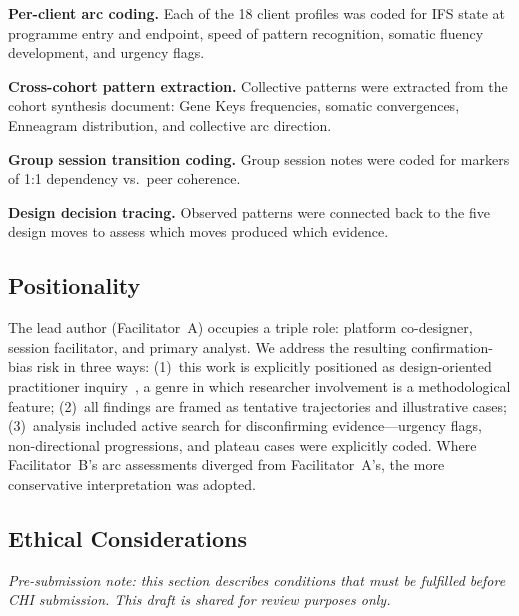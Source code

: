 \documentclass[sigchi,review,anonymous]{acmart}
\begin{document}
\textbf{Per-client arc coding.} Each of the 18 client profiles was coded for IFS state at
programme entry and endpoint, speed of pattern recognition, somatic fluency development, and
urgency flags.

\textbf{Cross-cohort pattern extraction.} Collective patterns were extracted from the cohort
synthesis document: Gene Keys frequencies, somatic convergences, Enneagram distribution, and
collective arc direction.

\textbf{Group session transition coding.} Group session notes were coded for markers of 1:1
dependency vs.\ peer coherence.

\textbf{Design decision tracing.} Observed patterns were connected back to the five design
moves to assess which moves produced which evidence.

\subsection{Positionality}

The lead author (Facilitator~A) occupies a triple role: platform co-designer, session
facilitator, and primary analyst. We address the resulting confirmation-bias risk in three
ways: (1)~this work is explicitly positioned as design-oriented practitioner inquiry~\cite{schon1983reflective},
a genre in which researcher involvement is a methodological feature; (2)~all findings are
framed as tentative trajectories and illustrative cases; (3)~analysis included active
search for disconfirming evidence---urgency flags, non-directional progressions, and
plateau cases were explicitly coded. Where Facilitator~B's arc assessments diverged from
Facilitator~A's, the more conservative interpretation was adopted.

\subsection{Ethical Considerations}

\emph{Pre-submission note: this section describes conditions that must be fulfilled before
CHI submission. This draft is shared for review purposes only.}
\end{document}
